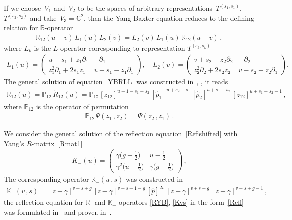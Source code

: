 \documentclass[a4paper,11pt]{article}
\numberwithin{equation}{section}
\begin{document}
If we choose~$V_1$ and~$V_2$ to be the spaces of arbitrary representations~$T^{(s_1,\bar{s}_1)}$, $T^{(s_2,\bar{s}_2)}$ and take~$V_3=\mathbb{C}^2$, then the Yang-Baxter equation reduces to the defining relation for $\mathbb{R}$-operator
\begin{align} \label{YBRLL}
	\mathbb{R}_{12}(u-v)\,L_1(u)\,L_2(v) = 
	L_2(v)\,L_1(u)\,\mathbb{R}_{12}(u-v) \,,
\end{align}
where $L_k$ is the $L$-operator corresponding to representation $T^{(s_k,\bar{s}_k)}$
\begin{align*}
	L_1(u) = 
	\left(\begin{array}{cc} u+s_1+z_1 \partial_1 & -\partial_1\\
		z_1^2 \partial_1 + 2s_1 z_1 & u-s_1 -z_1
		\partial_1
	\end{array}\right) , \quad
	L_2(v) = 
	\left(\begin{array}{cc} v+s_2+z_2 \partial_2 & -\partial_2\\
		z_2^2 \partial_2 + 2s_2 z_2 & v-s_2 -z_2
		\partial_1
	\end{array}\right) .
\end{align*}
The general solution of equation~\eqref{YBRLL} was constructed in~\cite{DKM}, \cite[\S3]{DM09}, it reads
\begin{align}\label{RYB}
	\mathbb{R}_{12}(u) = \mathbb{P}_{12}\,\check{R}_{12}(u) = \mathbb{P}_{12}\,
	[z_{12}]^{u+1-s_1-s_2}\,
	[\hat{p}_1]^{u+s_2-s_1}\,[\hat{p}_2]^{u+s_1-s_2}\,
	[z_{12}]^{u+s_1+s_2-1} \,,
\end{align}
where $\mathbb{P}_{12}$ is the operator of permutation 
\begin{align} \label{perm}
	\mathbb{P}_{12}\,\Psi(z_1\,,z_2) = \Psi(z_2\,,z_1) \,.
\end{align}

We consider the general solution of the reflection equation~\eqref{Reflshifted} with Yang's $R$-matrix~\eqref{Rmat1}~\cite{Skl:Boundary,PP,KulSk}
\begin{align*}
	K_-(u) = \begin{pmatrix}
		\gamma\bigl(g - \frac{1}{2} \bigr) & u - \frac{1}{2} \\
		\gamma^2 \bigl(u - \frac{1}{2} \bigr) & \gamma\bigl(g - \frac{1}{2} \bigr)
	\end{pmatrix} \,,
\end{align*}
The corresponding operator $\mathbb{K}_-(u\,,s)$ was constructed in~\cite{ABDV}
\begin{align}\label{Kvs}
	\mathbb{K}_-(v\,,s) =
	[z+\gamma]^{v-s+g} \,
	[z-\gamma]^{v-s+1-g} \,
	[\hat{p}]^{2v} \,
	[z+\gamma]^{v+s-g} \,
	[z-\gamma]^{v+s+g-1} \,,
\end{align}
the reflection equation for $\mathbb{R}$- and $\mathbb{K}_-$-operators \eqref{RYB}, \eqref{Kvs} in the form~\eqref{Refl} was formulated in~\cite{ABDV,Oliv} and proven in~\cite{ADV2}.
\end{document}
